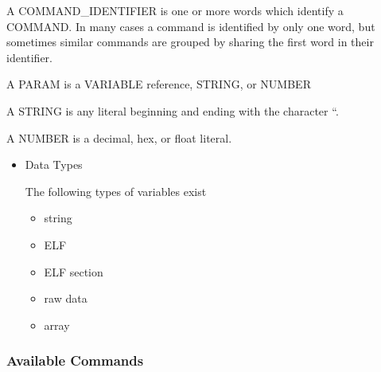 \documentclass[11pt]{article}
\begin{document}
    A COMMAND\_{}IDENTIFIER is one or more words which identify a
    COMMAND. In many cases a command is identified by only one word,
    but sometimes similar commands are grouped by sharing the first
    word in their identifier.

    A PARAM is a VARIABLE reference, STRING, or NUMBER

    A STRING is any literal beginning and ending with the character ``.

    A NUMBER is a decimal, hex, or float literal.

\begin{itemize}

\item Data Types\\
\label{sec-2.1.1.1}

     The following types of variables exist
\begin{itemize}
\item string
\item ELF
\item ELF section
\item raw data
\item array
\end{itemize}
\end{itemize} %
\subsubsection{Available Commands}
\label{sec-2.1.2}
\end{document}
